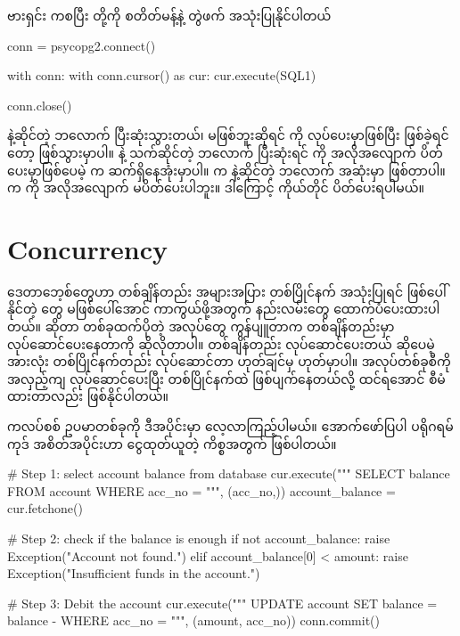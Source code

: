 \begin{mytcboxflt}
 ဗားရှင်း  ကစပြီး  တို့ကို  စတိတ်မန့်နဲ့ တွဲဖက် အသုံးပြုနိုင်ပါတယ်
%
\begin{pytc}
conn = psycopg2.connect()

with conn:
    with conn.cursor() as cur:
        cur.execute(SQL1)

conn.close()
\end{pytc}
 နဲ့ဆိုင်တဲ့  ဘလောက်  ပြီးဆုံးသွားတယ်၊  မဖြစ်ဘူးဆိုရင်  ကို   လုပ်ပေးမှာဖြစ်ပြီး  ဖြစ်ခဲ့ရင်တော့  ဖြစ်သွားမှာပါ။  နဲ့ သက်ဆိုင်တဲ့  ဘလောက်  ပြီးဆုံးရင်  ကို အလိုအလျောက် ပိတ်ပေးမှာဖြစ်ပေမဲ့  က ဆက်ရှိနေအုံးမှာပါ။  က  နဲ့ဆိုင်တဲ့  ဘလောက် အဆုံးမှာ ဖြစ်တာပါ။  က  ကို အလိုအလျောက် မပိတ်ပေးပါဘူး။ ဒါကြောင့် ကိုယ်တိုင် ပိတ်ပေးရပါမယ်။
\end{mytcboxflt}
\clearpage


\section{Concurrency}
ဒေတာဘေ့စ်တွေဟာ တစ်ချိန်တည်း  အများအပြား တစ်ပြိုင်နက် အသုံးပြုရင် ဖြစ်ပေါ်နိုင်တဲ့  တွေ မဖြစ်ပေါ်အောင် ကာကွယ်ဖို့အတွက် နည်းလမ်းတွေ ထောက်ပံပေးထားပါတယ်။  ဆိုတာ တစ်ခုထက်ပိုတဲ့ အလုပ်တွေ ကွန်ပျူတာက တစ်ချိန်တည်းမှာ လုပ်ဆောင်ပေးနေတာကို ဆိုလိုတာပါ။ တစ်ချိန်တည်း လုပ်ဆောင်ပေးတယ် ဆိုပေမဲ့ အားလုံး တစ်ပြိုင်နက်တည်း လုပ်ဆောင်တာ ဟုတ်ချင်မှ ဟုတ်မှာပါ။ အလုပ်တစ်ခုစီကို အလှည့်ကျ လုပ်ဆောင်ပေးပြီး တစ်ပြိုင်နက်ထဲ ဖြစ်ပျက်နေတယ်လို့ ထင်ရအောင် စီမံထားတာလည်း ဖြစ်နိုင်ပါတယ်။ 

ကလပ်စစ်  ဥပမာတစ်ခုကို ဒီအပိုင်းမှာ လေ့လာကြည့်ပါမယ်။ အောက်ဖော်ပြပါ ပရိုဂရမ်ကုဒ် အစိတ်အပိုင်းဟာ ငွေထုတ်ယူတဲ့ ကိစ္စအတွက် ဖြစ်ပါတယ်။
%
\begin{py}
# Step 1: select account balance from database
cur.execute("""
    SELECT balance FROM account WHERE acc_no = %
""", (acc_no,))
account_balance = cur.fetchone()

# Step 2: check if the balance is enough
if not account_balance:
    raise Exception("Account not found.")
elif account_balance[0] < amount:
    raise Exception("Insufficient funds in the account.")

# Step 3: Debit the account
cur.execute("""
    UPDATE account
    SET balance = balance - %
    WHERE acc_no = %
""", (amount, acc_no))
conn.commit()
\end{py}
%

